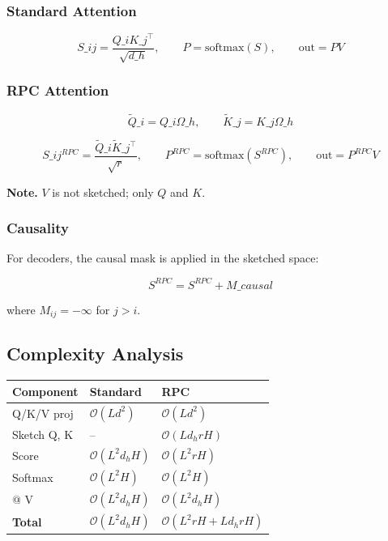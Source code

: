 \subsubsection{Standard Attention}

\[
S\_{ij} = \frac{Q\_i K\_j^\top}{\sqrt{d\_h}}, \qquad
P = \text{softmax}(S), \qquad
\text{out} = P V
\tag{4.2}
\]

\subsubsection{RPC Attention}

\[
\tilde{Q}\_i = Q\_i \Omega\_h, \qquad
\tilde{K}\_j = K\_j \Omega\_h
\tag{4.3}
\]

\[
S\_{ij}^{RPC} = \frac{\tilde{Q}\_i \tilde{K}\_j^\top}{\sqrt{r}}, \qquad
P^{RPC} = \text{softmax}(S^{RPC}), \qquad
\text{out} = P^{RPC} V
\tag{4.4}
\]

\textbf{Note.} $V$ is not sketched; only $Q$ and $K$.

\subsubsection{Causality}

For decoders, the causal mask is applied in the sketched space:

\[
S^{RPC} = S^{RPC} + M\_{causal}
\tag{4.5}
\]

where $M_{ij} = -\infty$ for $j > i$.

\subsection{Complexity Analysis}

\begin{table}[H]
\centering
\small
\begin{tabular}{lll}
\toprule
\textbf{Component} & \textbf{Standard} & \textbf{RPC} \\
\midrule
Q/K/V proj & $\mathcal{O}(L d^2)$ & $\mathcal{O}(L d^2)$ \\
Sketch Q, K & -- & $\mathcal{O}(L d_h r H)$ \\
Score & $\mathcal{O}(L^2 d_h H)$ & $\mathcal{O}(L^2 r H)$ \\
Softmax & $\mathcal{O}(L^2 H)$ & $\mathcal{O}(L^2 H)$ \\
@ V & $\mathcal{O}(L^2 d_h H)$ & $\mathcal{O}(L^2 d_h H)$ \\
\textbf{Total} & $\mathcal{O}(L^2 d_h H)$ & $\mathcal{O}(L^2 r H + L d_h r H)$ \\
\bottomrule
\end{tabular}
\end{table}


